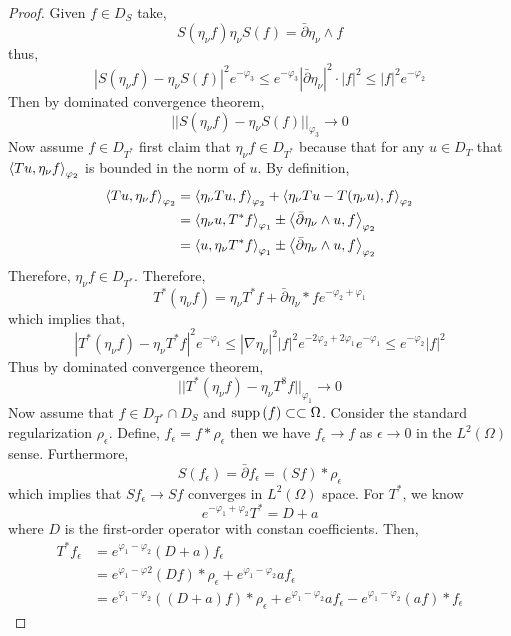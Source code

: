 \documentclass[12pt]{extarticle}
\theoremstyle{definition}
\begin{document}
\begin{proof}
Given $f \in D_S$ take,
\[ S(\eta_\nu f)  \eta_\nu S(f) = \bar{\partial} \eta_\nu \wedge f \]
thus,
\[ | S(\eta_\nu f) - \eta_\nu S(f) |^2 e^{-\varphi_3} \le e^{-\varphi_3} | \bar{\partial} \eta_\nu |^2 \cdot |f|^2 \le |f|^2 e^{-\varphi_2} \]
Then by dominated convergence theorem,
\[ || S(\eta_\nu f) - \eta_\nu S(f) ||_{\varphi_3} \to 0 \]
Now assume $f \in D_{T^*}$ first claim that $\eta_\nu f \in D_{T^*}$ because that for any $u \in D_T$ that $\left< T u, \eta_\nu f \right>_{\varphi_2}$ is bounded in the norm of $u$. By definition,
\begin{align*}
\left< Tu, \eta_\nu f \right>_{\varphi_2} & = \left< \eta_\nu T u, f \right>_{\varphi_2} + \left< \eta_\nu T u - T(\eta_\nu u), f \right>_{\varphi_2} 
\\
& = \left< \eta_\nu u, T^* f \right>_{\varphi_1} \pm \left< \bar{\partial} \eta_\nu \wedge u, f \right>_{\varphi_2} 
\\
& = \left< u, \eta_\nu T^* f \right>_{\varphi_1} \pm \left< \bar{\partial} \eta_\nu \wedge u, f \right>_{\varphi_2} 
\end{align*}
Therefore, $\eta_\nu f \in D_{T^*}$. 
Therefore,
\[ T^*(\eta_\nu f) = \eta_\nu T^* f + \bar{\partial} \eta_\nu * f e^{-\varphi_2 + \varphi_1} \]
which implies that,
\[ | T^* (\eta_\nu f) - \eta_\nu T^* f |^2 e^{-\varphi_1} \le | \nabla \eta_\nu |^2 |f|^2 e^{-2 \varphi_2 + 2 \varphi_1} e^{-\varphi_1} \le e^{-\varphi_2} |f|^2 \]
Thus by dominated convergence theorem,
\[ || T^*(\eta_\nu f) - \eta_\nu T^8 f ||_{\varphi_1} \to 0 \]
Now assume that $f \in D_{T^*} \cap D_S$ and $\mathrm{supp}\left( f \right) \subset \subset \Omega$. Consider the standard regularization $\rho_\epsilon$. Define, $f_\epsilon = f * \rho_\epsilon$ then we have $f_\epsilon \to f$ as $\epsilon \to 0$ in the $L^2(\Omega)$ sense. Furthermore,
\[ S(f_\epsilon) = \bar{\partial} f_{\epsilon} = (S f) * \rho_\epsilon \]
which implies that $S f_\epsilon \to S f$ converges in $L^2(\Omega)$ space. For $T^*$, we know
\[ e^{-\varphi_1 + \varphi_2}  T^* =  D + a \]
where $D$ is the first-order operator with constan coefficients. Then,
\begin{align*}
T^* f_\epsilon & = e^{\varphi_1 - \varphi_2} (D + a) f_\epsilon 
\\
& = e^{\varphi_1 - \varphi2} (D f) * \rho_\epsilon + e^{\varphi_1 - \varphi_2} a f_\epsilon 
\\
& = e^{\varphi_1 - \varphi_2} ((D + a) f) * \rho_\epsilon + e^{\varphi_1 - \varphi_2} a f_\epsilon - e^{\varphi_1 - \varphi_2} (af) * f_\epsilon  
\end{align*} 

\end{proof}
\end{document}
